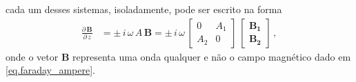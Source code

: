 %
cada um desses sistemas, isoladamente, pode ser escrito na forma 
\begin{align}\label{eq.matricial}
\frac{\partial\,\mathbf{B}}{\partial\,z} &= \pm\,i\,\omega\,A\,\mathbf{B} = \pm\,i\,\omega\,
\begin{bmatrix}
0&A_1\\
A_2&0
\end{bmatrix}\,
\begin{bmatrix}
\mathbf{B_1}\\
\mathbf{B_2}	
\end{bmatrix}\,,
\end{align}
onde o vetor $\mathbf{B}$ representa uma onda qualquer e n\~ao o campo magn\'etico dado em \ref{eq.faraday_ampere}.

